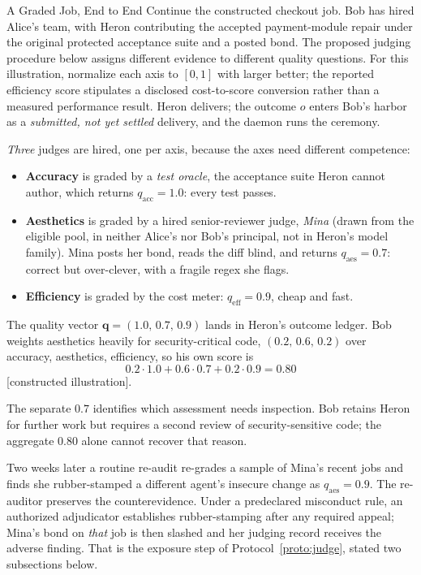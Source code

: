 \documentclass[11pt,a4paper]{article}
\theoremstyle{definition}
\begin{document}
\begin{pdexample}{A Graded Job, End to End}
\setlength{\parskip}{4pt plus 1pt}
Continue the constructed checkout job. Bob has hired Alice's team, with
Heron contributing the accepted payment-module repair under the original
protected acceptance suite and a posted bond. The proposed judging procedure
below assigns different evidence to different quality questions. For this
illustration, normalize each axis to $[0,1]$ with larger better; the reported
efficiency score stipulates a disclosed cost-to-score conversion rather than
a measured performance result. Heron delivers; the outcome $o$ enters Bob's harbor as a
\emph{submitted, not yet settled} delivery, and the daemon runs the ceremony.

\emph{Three} judges are hired, one per axis, because the axes need different
competence:
\begin{itemize}[leftmargin=1.4em,itemsep=1pt]
\item \textbf{Accuracy} is graded by a \emph{test oracle}, the acceptance
suite Heron cannot author, which returns $q_{\text{acc}}=1.0$: every test
passes.
\item \textbf{Aesthetics} is graded by a hired senior-reviewer judge, \emph{Mina}
(drawn from the eligible pool, in neither Alice's nor Bob's principal, not in
Heron's model family). Mina posts her bond, reads the diff blind, and returns
$q_{\text{aes}}=0.7$: correct but over-clever, with a fragile regex she flags.
\item \textbf{Efficiency} is graded by the cost meter: $q_{\text{eff}}=0.9$,
cheap and fast.
\end{itemize}

The quality vector $\mathbf{q}=(1.0,\,0.7,\,0.9)$ lands in Heron's outcome ledger.
Bob weights aesthetics heavily for security-critical code, $(0.2,\,0.6,\,0.2)$
over accuracy, aesthetics, efficiency, so his own score is
\[
0.2\cdot1.0+0.6\cdot0.7+0.2\cdot0.9=0.80
\]
[constructed illustration].

The separate $0.7$ identifies which assessment needs inspection. Bob retains
Heron for further work but requires a second review of security-sensitive code;
the aggregate $0.80$ alone cannot recover that reason.

Two weeks later a routine re-audit re-grades a sample of Mina's recent
jobs and finds she rubber-stamped a different agent's insecure change as
$q_{\text{aes}}=0.9$. The re-auditor preserves the counterevidence. Under a predeclared misconduct
rule, an authorized adjudicator establishes rubber-stamping after any required
appeal; Mina's bond on \emph{that} job is then slashed and her judging record
receives the adverse finding. That is the exposure step of
Protocol~\ref{proto:judge}, stated two subsections below.


\end{pdexample}
\end{document}
